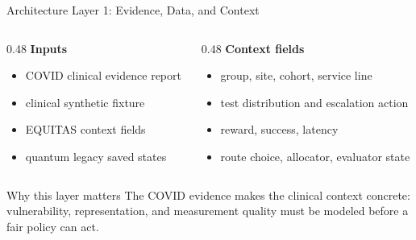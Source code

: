 \documentclass[aspectratio=169,10pt]{beamer}
\begin{document}
\begin{frame}{Architecture Layer 1: Evidence, Data, and Context}
\begin{columns}[T]
\begin{column}{0.48\textwidth}
\textbf{Inputs}
\begin{itemize}
    \item COVID clinical evidence report
    \item clinical synthetic fixture
    \item EQUITAS context fields
    \item quantum legacy saved states
\end{itemize}
\end{column}
\begin{column}{0.48\textwidth}
\textbf{Context fields}
\begin{itemize}
    \item group, site, cohort, service line
    \item test distribution and escalation action
    \item reward, success, latency
    \item route choice, allocator, evaluator state
\end{itemize}
\end{column}
\end{columns}

\vspace{0.6em}
\begin{block}{Why this layer matters}
The COVID evidence makes the clinical context concrete: vulnerability, representation, and measurement quality must be modeled before a fair policy can act.
\end{block}
\end{frame}
\end{document}
